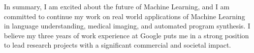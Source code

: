 \documentclass[a4paper, 10pt]{article}
\begin{document}
In summary, I am excited about the future of Machine Learning, and I
am committed to continue my work on real world applications of Machine
Learning in language understanding, medical imaging, and automated
program synthesis. I believe my three years of work experience at
Google puts me in a strong position to lead research projects with a
significant commercial and societal impact.


\vspace{0.5cm}


\begin{small}




\end{small}
\end{document}
